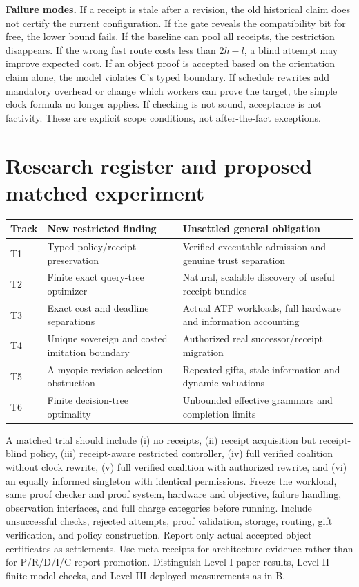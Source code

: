 \documentclass[11pt,letterpaper]{article}
\begin{document}
\textbf{Failure modes.} If a receipt is stale after a revision, the old historical claim does not certify the current configuration. If the gate reveals the compatibility bit for free, the lower bound fails. If the baseline can pool all receipts, the restriction disappears. If the wrong fast route costs less than $2h-l$, a blind attempt may improve expected cost. If an object proof is accepted based on the orientation claim alone, the model violates C's typed boundary. If schedule rewrites add mandatory overhead or change which workers can prove the target, the simple clock formula no longer applies. If checking is not sound, acceptance is not factivity. These are explicit scope conditions, not after-the-fact exceptions.

\section{Research register and proposed matched experiment}
\begin{center}\small
\begin{tabularx}{\linewidth}{p{.11\linewidth}XX}
\toprule
Track & New restricted finding & Unsettled general obligation\\\midrule
T1 & Typed policy/receipt preservation & Verified executable admission and genuine trust separation\\
T2 & Finite exact query-tree optimizer & Natural, scalable discovery of useful receipt bundles\\
T3 & Exact cost and deadline separations & Actual ATP workloads, full hardware and information accounting\\
T4 & Unique sovereign and costed imitation boundary & Authorized real successor/receipt migration\\
T5 & A myopic revision-selection obstruction & Repeated gifts, stale information and dynamic valuations\\
T6 & Finite decision-tree optimality & Unbounded effective grammars and completion limits\\\bottomrule
\end{tabularx}\end{center}
A matched trial should include (i) no receipts, (ii) receipt acquisition but receipt-blind policy, (iii) receipt-aware restricted controller, (iv) full verified coalition without clock rewrite, (v) full verified coalition with authorized rewrite, and (vi) an equally informed singleton with identical permissions. Freeze the workload, same proof checker and proof system, hardware and objective, failure handling, observation interfaces, and full charge categories before running. Include unsuccessful checks, rejected attempts, proof validation, storage, routing, gift verification, and policy construction. Report only actual accepted object certificates as settlements. Use meta-receipts for architecture evidence rather than for P/R/D/I/C report promotion. Distinguish Level I paper results, Level II finite-model checks, and Level III deployed measurements as in B.
\end{document}
